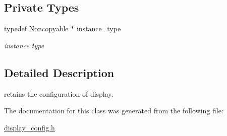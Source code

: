 \subsection*{Private Types}
\begin{DoxyCompactItemize}
\item 
\hypertarget{classhryky_1_1_noncopyable_aaf87abb55f700af85ecb0895f6178821}{typedef \hyperlink{classhryky_1_1_noncopyable}{Noncopyable} $\ast$ \hyperlink{classhryky_1_1_noncopyable_aaf87abb55f700af85ecb0895f6178821}{instance\-\_\-type}}\label{classhryky_1_1_noncopyable_aaf87abb55f700af85ecb0895f6178821}

\begin{DoxyCompactList}\small\item\em instance type \end{DoxyCompactList}\end{DoxyCompactItemize}


\subsection{Detailed Description}
retains the configuration of display. 

The documentation for this class was generated from the following file\-:\begin{DoxyCompactItemize}
\item 
\hyperlink{display__config_8h}{display\-\_\-config.\-h}\end{DoxyCompactItemize}
